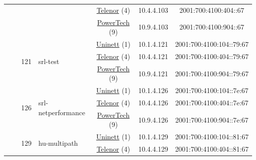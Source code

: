 \begin{small}
\begin{center}
\begin{longtable}{|c|c|c|c|c|c|c|c|}
  &  & \multicolumn{2}{|c|}{} & \multicolumn{2}{|c|}{\tiny{\href{https://www.telenor.no}{Telenor} (4)}} & \tiny{10.4.4.103} & \tiny{2001:700:4100:404::67} \\* \cline{5-5}\cline{6-6}\cline{7-7}\cline{8-8}
  &  & \multicolumn{2}{|c|}{} & \multicolumn{2}{|c|}{\tiny{\href{http://www.powertech.no}{PowerTech} (9)}} & \tiny{10.9.4.103} & \tiny{2001:700:4100:904::67} \\* \cline{3-3}\cline{4-4}\cline{5-5}\cline{6-6}\cline{7-7}\cline{8-8}
  &  & \multirow{3}{*}{\tiny{121}} & \multicolumn{1}{|l|}{\multirow{3}{*}{\tiny{srl-test}}} & \multicolumn{2}{|c|}{\tiny{\href{https://www.uninett.no}{Uninett} (1)}} & \tiny{10.1.4.121} & \tiny{2001:700:4100:104::79:67} \\* \cline{5-5}\cline{6-6}\cline{7-7}\cline{8-8}
  &  &  &  & \multicolumn{2}{|c|}{\tiny{\href{https://www.telenor.no}{Telenor} (4)}} & \tiny{10.4.4.121} & \tiny{2001:700:4100:404::79:67} \\* \cline{5-5}\cline{6-6}\cline{7-7}\cline{8-8}
  &  &  &  & \multicolumn{2}{|c|}{\tiny{\href{http://www.powertech.no}{PowerTech} (9)}} & \tiny{10.9.4.121} & \tiny{2001:700:4100:904::79:67} \\* \cline{3-3}\cline{4-4}\cline{5-5}\cline{6-6}\cline{7-7}\cline{8-8}
  &  & \multirow{3}{*}{\tiny{126}} & \multicolumn{1}{|l|}{\multirow{3}{*}{\tiny{srl-netperformance}}} & \multicolumn{2}{|c|}{\tiny{\href{https://www.uninett.no}{Uninett} (1)}} & \tiny{10.1.4.126} & \tiny{2001:700:4100:104::7e:67} \\* \cline{5-5}\cline{6-6}\cline{7-7}\cline{8-8}
  &  &  &  & \multicolumn{2}{|c|}{\tiny{\href{https://www.telenor.no}{Telenor} (4)}} & \tiny{10.4.4.126} & \tiny{2001:700:4100:404::7e:67} \\* \cline{5-5}\cline{6-6}\cline{7-7}\cline{8-8}
  &  &  &  & \multicolumn{2}{|c|}{\tiny{\href{http://www.powertech.no}{PowerTech} (9)}} & \tiny{10.9.4.126} & \tiny{2001:700:4100:904::7e:67} \\* \cline{3-3}\cline{4-4}\cline{5-5}\cline{6-6}\cline{7-7}\cline{8-8}
  &  & \multirow{3}{*}{\tiny{129}} & \multicolumn{1}{|l|}{\multirow{3}{*}{\tiny{hu-multipath}}} & \multicolumn{2}{|c|}{\tiny{\href{https://www.uninett.no}{Uninett} (1)}} & \tiny{10.1.4.129} & \tiny{2001:700:4100:104::81:67} \\* \cline{5-5}\cline{6-6}\cline{7-7}\cline{8-8}
  &  &  &  & \multicolumn{2}{|c|}{\tiny{\href{https://www.telenor.no}{Telenor} (4)}} & \tiny{10.4.4.129} & \tiny{2001:700:4100:404::81:67} \\* \cline{5-5}\cline{6-6}\cline{7-7}\cline{8-8}

\end{longtable}
\end{center}
\end{small}
